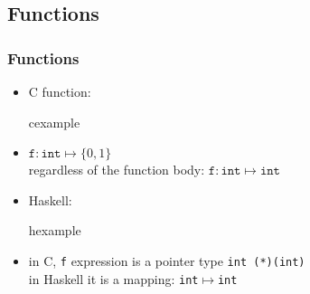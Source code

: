 
\subsection{Functions}
\begin{frame}
 \frametitle{Functions}
\begin{itemize}
 \item C function:
\begin{beamercolorbox}{cexample}
\codefonkesC
\end{beamercolorbox}
\item $\mathtt{f}:\mathtt{int} \mapsto \{0,1\}$\\
	regardless of the function body: $\mathtt{f}:\mathtt{int} \mapsto \mathtt{int}$
\item Haskell:
\begin{beamercolorbox}{hexample}
\codefonkesH
\end{beamercolorbox}
\item in C, \texttt{f} expression is a pointer type
	\mbox{\texttt{int (*)(int)}}\\
	in Haskell it is a mapping: \mbox{\texttt{int$\mapsto$int}}
\end{itemize}
\end{frame}

